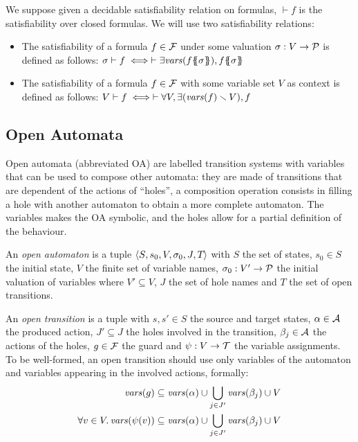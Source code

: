 \documentclass[runningheads]{llncs}
\begin{document}
 We suppose given a decidable satisfiability relation on formulas, \({\vdash} f\) is the satisfiability over closed formulas.
We will  use two satisfiability relations:
\begin{itemize}
\item The satisfiability of a formula \(f \in {\mathcal{F}}\) under some valuation \(\sigma: V \to \mathcal{P}\) is defined as follows:
\( \sigma \vdash f \iff \vdash \exists \fvars{f\psubst{\sigma}}, f\psubst{\sigma} \)
\item The satisfiability of a formula \(f \in {\mathcal{F}}\) with some variable set \(V\) as context is defined as follows:
\( V \vdash f \iff  \vdash \forall V, \exists{\left(\mathit{vars}{\left(f\right)} \smallsetminus V\right)}, f \)
\end{itemize}


\subsection{Open Automata}\label{sec:def}
 Open automata (abbreviated OA) are labelled transition systems with variables  that can be used to compose other automata: they are made of transitions that are dependent of the actions of ``holes'', a composition operation consists in filling a hole with another automaton to obtain a more complete automaton. The variables makes the OA symbolic, and the holes allow for a partial definition of the behaviour.

\begin{definition}
An \emph{open automaton} is a tuple \(\left<S_{},s_{0},V_{},\sigma_{0},J_{},T_{}\right>\) with \(S\) the set of states, \(s_0 \in S\) the initial state, \(V\) the finite set of variable names, \(\sigma_0: V' \to \mathcal{P}\) the initial valuation of variables where \(V' \subseteq V\), \(J\) the set of hole names and \(T\) the set of open transitions. 

An \emph{open transition} is a tuple \nmm{\OTg} with \(s, s' \in S\) the source and target states, \(\alpha \in \mathcal{A}\) the produced action, \(J' \subseteq J\) the holes involved in the transition, \(\beta_j \in \mathcal{A}\) the actions of the holes, \(g \in {\mathcal{F}}\) the guard and \(\psi: V \to {\mathcal{T}}\) the variable assignments.
To be well-formed, an open transition should use only variables of the automaton and variables appearing in the involved actions, formally: 
\begin{align*}
\mathit{vars}{\left(g\right)}&\subseteq \mathit{vars}{\left(\alpha\right)}\cup \bigcup_{j \in J'} \mathit{vars}{\left(\beta_j\right)} \cup V \\ \forall v\in V.\, \mathit{vars}{\left(\psi(v)\right)}&\subseteq \mathit{vars}{\left(\alpha\right)}\cup \bigcup_{j \in J'} \mathit{vars}{\left(\beta_j\right)} \cup V
\end{align*}
\end{definition}
\end{document}
